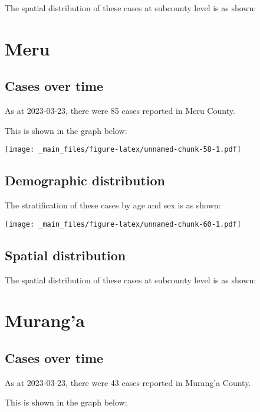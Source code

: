 \documentclass[
]{book}
\begin{document}
The spatial distribution of these cases at subcounty level is as shown:

\hypertarget{meru}{%
\chapter{Meru}\label{meru}}

\hypertarget{cases-over-time-9}{%
\section{Cases over time}\label{cases-over-time-9}}

As at 2023-03-23, there were 85 cases reported in Meru County.

This is shown in the graph below:

\texttt{[image: \_main\_files/figure-latex/unnamed-chunk-58-1.pdf]}

\hypertarget{demographic-distribution-9}{%
\section{Demographic distribution}\label{demographic-distribution-9}}

The stratification of these cases by age and sex is as shown:

\texttt{[image: \_main\_files/figure-latex/unnamed-chunk-60-1.pdf]}

\hypertarget{spatial-distribution-9}{%
\section{Spatial distribution}\label{spatial-distribution-9}}

The spatial distribution of these cases at subcounty level is as shown:

\hypertarget{muranga}{%
\chapter{Murang'a}\label{muranga}}

\hypertarget{cases-over-time-10}{%
\section{Cases over time}\label{cases-over-time-10}}

As at 2023-03-23, there were 43 cases reported in Murang'a County.

This is shown in the graph below:
\end{document}
